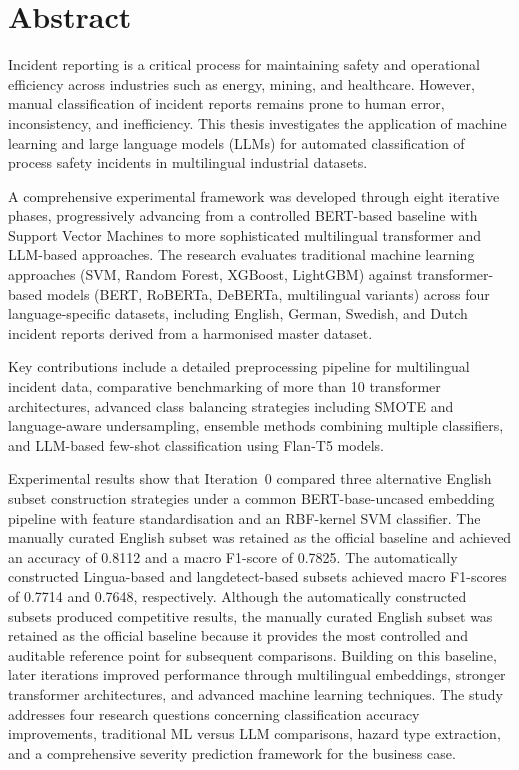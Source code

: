 \documentclass[11pt, titlepage, bibliography=totoc]{scrreprt}
\begin{document}
\chapter*{Abstract}

Incident reporting is a critical process for maintaining safety and operational efficiency across industries such as energy, mining, and healthcare. However, manual classification of incident reports remains prone to human error, inconsistency, and inefficiency. This thesis investigates the application of machine learning and large language models (LLMs) for automated classification of process safety incidents in multilingual industrial datasets.

A comprehensive experimental framework was developed through eight iterative phases, progressively advancing from a controlled BERT-based baseline with Support Vector Machines to more sophisticated multilingual transformer and LLM-based approaches. The research evaluates traditional machine learning approaches (SVM, Random Forest, XGBoost, LightGBM) against transformer-based models (BERT, RoBERTa, DeBERTa, multilingual variants) across four language-specific datasets, including English, German, Swedish, and Dutch incident reports derived from a harmonised master dataset.

Key contributions include a detailed preprocessing pipeline for multilingual incident data, comparative benchmarking of more than 10 transformer architectures, advanced class balancing strategies including SMOTE and language-aware undersampling, ensemble methods combining multiple classifiers, and LLM-based few-shot classification using Flan-T5 models.


Experimental results show that Iteration~0 compared three alternative English subset construction strategies under a common BERT-base-uncased embedding pipeline with feature standardisation and an RBF-kernel SVM classifier. The manually curated English subset was retained as the official baseline and achieved an accuracy of 0.8112 and a macro F1-score of 0.7825. The automatically constructed Lingua-based and langdetect-based subsets achieved macro F1-scores of 0.7714 and 0.7648, respectively. Although the automatically constructed subsets produced competitive results, the manually curated English subset was retained as the official baseline because it provides the most controlled and auditable reference point for subsequent comparisons. Building on this baseline, later iterations improved performance through multilingual embeddings, stronger transformer architectures, and advanced machine learning techniques. The study addresses four research questions concerning classification accuracy improvements, traditional ML versus LLM comparisons, hazard type extraction, and a comprehensive severity prediction framework for the business case.
\end{document}
